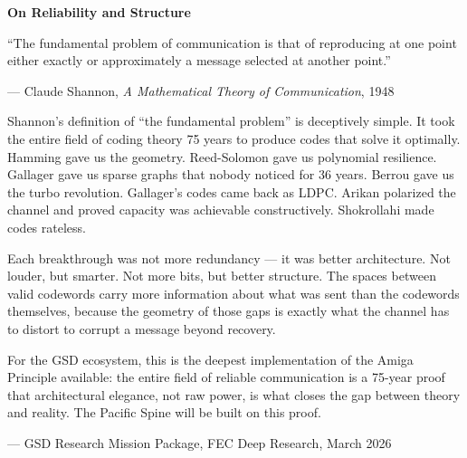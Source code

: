 \documentclass[11pt,letterpaper]{article}
\begin{document}
\begin{quotebox}
\textbf{\sffamily\large\textcolor{primary}{On Reliability and Structure}}

\vspace{0.5em}

``The fundamental problem of communication is that of reproducing at one point either exactly or approximately a message selected at another point.''

\vspace{0.3em}
{\small\sffamily --- Claude Shannon, \textit{A Mathematical Theory of Communication}, 1948}

\vspace{1em}

Shannon's definition of ``the fundamental problem'' is deceptively simple. It took the entire field of coding theory 75 years to produce codes that solve it optimally. Hamming gave us the geometry. Reed-Solomon gave us polynomial resilience. Gallager gave us sparse graphs that nobody noticed for 36 years. Berrou gave us the turbo revolution. Gallager's codes came back as LDPC. Arikan polarized the channel and proved capacity was achievable constructively. Shokrollahi made codes rateless.

Each breakthrough was not more redundancy --- it was better architecture. Not louder, but smarter. Not more bits, but better structure. The spaces between valid codewords carry more information about what was sent than the codewords themselves, because the geometry of those gaps is exactly what the channel has to distort to corrupt a message beyond recovery.

For the GSD ecosystem, this is the deepest implementation of the Amiga Principle available: the entire field of reliable communication is a 75-year proof that architectural elegance, not raw power, is what closes the gap between theory and reality. The Pacific Spine will be built on this proof.

\vspace{0.3em}
{\small\sffamily\textcolor{subtlegray}{--- GSD Research Mission Package, FEC Deep Research, March 2026}}
\end{quotebox}
\end{document}
